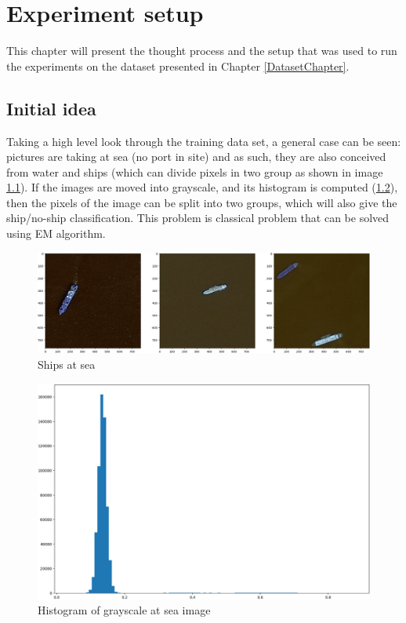 \chapter{Experiment setup}
\label{ExperimentSetup}

This chapter will present the thought process and the setup that was used to run the experiments on the dataset presented in Chapter \ref{DatasetChapter}.

\section{Initial idea}

Taking a high level look through the training data set, a general case can be seen: pictures are taking at sea (no port in site) and as such, they are also conceived from water and ships (which can divide pixels in two group as shown in image \ref{ShipExampleAtSea}). If the images are moved into grayscale, and its histogram is computed (\ref{ImageHistogram}), then the pixels of the image can be split into two groups, which will also give the ship/no-ship classification. This problem is classical problem that can be solved using EM algorithm.

\begin{figure}[h]
	\centering
	\includegraphics[height=0.2\textheight]{Pictures/002ShipExampleatSea.png}
	\caption{Ships at sea}
	\label{ShipExampleAtSea}
\end{figure}

\begin{figure}[h]
	\centering
	\includegraphics[width=\textwidth]{Pictures/005ImageHistogram.png}
	\caption{Histogram of grayscale at sea image}
	\label{ImageHistogram}
\end{figure}

